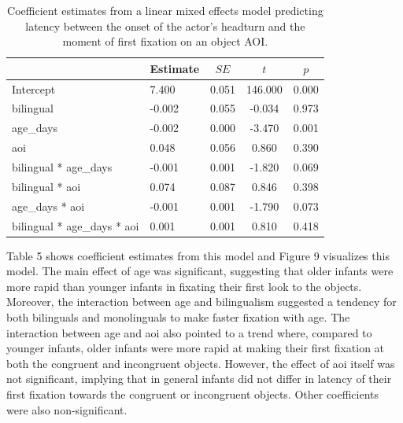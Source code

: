 \documentclass[,man,floatsintext]{apa6}
\begin{document}
\begin{table}[tbp]
\begin{center}
\begin{threeparttable}
\caption{\label{tab:coef_table_latency}Coefficient estimates from a linear mixed effects model predicting latency between the onset of the actor's headturn and the moment of first fixation on an object AOI.}
\begin{tabular}{llccc}
\toprule
 & Estimate & $SE$ & $t$ & $p$\\
\midrule
Intercept & 7.400 & 0.051 & 146.000 & 0.000\\
bilingual & -0.002 & 0.055 & -0.034 & 0.973\\
age\_days & -0.002 & 0.000 & -3.470 & 0.001\\
aoi & 0.048 & 0.056 & 0.860 & 0.390\\
bilingual * age\_days & -0.001 & 0.001 & -1.820 & 0.069\\
bilingual * aoi & 0.074 & 0.087 & 0.846 & 0.398\\
age\_days * aoi & -0.001 & 0.001 & -1.790 & 0.073\\
bilingual * age\_days * aoi & 0.001 & 0.001 & 0.810 & 0.418\\
\bottomrule
\end{tabular}
\end{threeparttable}
\end{center}
\end{table}

\noindent Table 5 shows coefficient estimates from this model and Figure 9 visualizes this model. The main effect of age was significant, suggesting that older infants were more rapid than younger infants in fixating their first look to the objects. Moreover, the interaction between age and bilingualism suggested a tendency for both bilinguals and monolinguals to make faster fixation with age. The interaction between age and aoi also pointed to a trend where, compared to younger infants, older infants were more rapid at making their first fixation at both the congruent and incongruent objects. However, the effect of aoi itself was not significant, implying that in general infants did not differ in latency of their first fixation towards the congruent or incongruent objects. Other coefficients were also non-significant.
\end{document}
